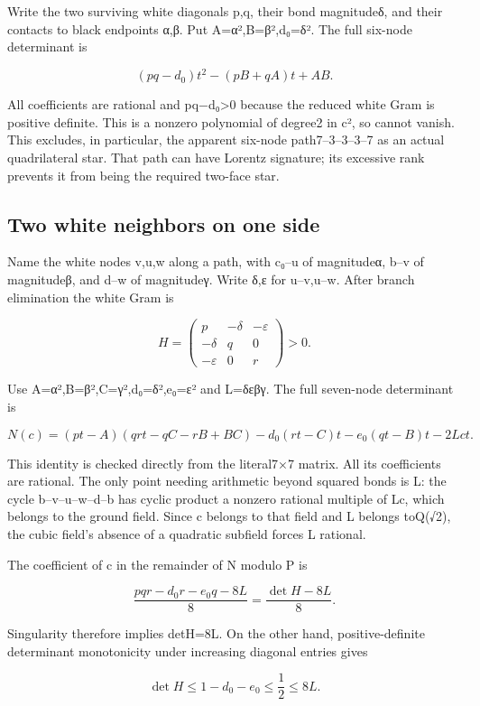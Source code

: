 \documentclass[
  10pt,
]{report}
\begin{document}
Write the two surviving white diagonals p,q, their bond magnitudeδ, and
their contacts to black endpoints α,β. Put A=α²,B=β²,d₀=δ². The full
six-node determinant is

\[
 (pq-d_0)t^2-(pB+qA)t+AB.
\]

All coefficients are rational and pq−d₀\textgreater0 because the reduced
white Gram is positive definite. This is a nonzero polynomial of degree2
in c², so cannot vanish. This excludes, in particular, the apparent
six-node path7--3--3--3--7 as an actual quadrilateral star. That path
can have Lorentz signature; its excessive rank prevents it from being
the required two-face star.

\subsection{Two white neighbors on one
side}\label{two-white-neighbors-on-one-side}

Name the white nodes v,u,w along a path, with c₀--u of magnitudeα, b--v
of magnitudeβ, and d--w of magnitudeγ. Write δ,ε for u--v,u--w. After
branch elimination the white Gram is

\[
 H=\begin{pmatrix}p&-\delta&-\varepsilon\\-\delta&q&0\\-\varepsilon&0&r\end{pmatrix}>0.
\]

Use A=α²,B=β²,C=γ²,d₀=δ²,e₀=ε² and L=δεβγ. The full seven-node
determinant is

\[
 N(c)=(pt-A)(qrt-qC-rB+BC)
       -d_0(rt-C)t-e_0(qt-B)t-2Lct.
\]

This identity is checked directly from the literal7×7 matrix. All its
coefficients are rational. The only point needing arithmetic beyond
squared bonds is L: the cycle b--v--u--w--d--b has cyclic product a
nonzero rational multiple of Lc, which belongs to the ground field.
Since c belongs to that field and L belongs toQ(√2), the cubic field's
absence of a quadratic subfield forces L rational.

The coefficient of c in the remainder of N modulo P is

\[
 \frac{pqr-d_0r-e_0q-8L}{8}=\frac{\det H-8L}{8}.
\]

Singularity therefore implies detH=8L. On the other hand,
positive-definite determinant monotonicity under increasing diagonal
entries gives

\[
 \det H\le 1-d_0-e_0\le\frac12\le8L.
\]
\end{document}

